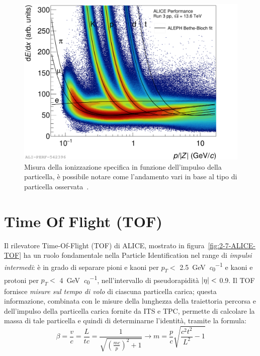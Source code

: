     \begin{figure}[p]
        \centering
        \includegraphics[width=1\linewidth]{res/fig/2-chapter/6-ALICE-pp13.6TeV-performance.pdf}
        \caption{Misura della ionizzazione specifica in funzione dell’impulso della particella, è possibile notare come l’andamento vari in base al tipo di particella osservata~\cite{ALICE-pp13.6TeV-performance}.}
        \label{fig:2-6-ALICE-pp13.6TeV-performance}
    \end{figure}


\section{Time Of Flight (TOF)}
\label{sec:2-TOF}
    Il rilevatore Time-Of-Flight (TOF) di ALICE, mostrato in figura~\ref{fig:2-7-ALICE-TOF} ha un ruolo fondamentale nella Particle Identification nel range di \textit{impulsi intermedi}: è in grado di separare pioni e kaoni per $p_{T} <$ \qty[per-mode = symbol]{2.5}{\giga \eV \per \clight} e kaoni e protoni per $p_{T} <$ \qty[per-mode = symbol]{4}{\giga \eV \per \clight}, nell’intervallo di pseudorapidità $\abs{\eta} <$ \num{0.9}. Il TOF fornisce \textit{misure sul tempo di volo} di ciascuna particella carica; questa informazione, combinata con le misure della lunghezza della traiettoria percorsa e dell'impulso della particella carica fornite da ITS e TPC, permette di calcolare la massa di tale particella e quindi di determinarne l'identità, tramite la formula:
    \begin{equation}
        \beta = \frac{v}{c} = \frac{L}{tc} = \frac{1}{\sqrt{\left(\frac{mc}{p}\right)^2 +1}} \to m = \frac{p}{c} \sqrt{\frac{c^2t^2}{L^2} - 1}
    \end{equation}
    
